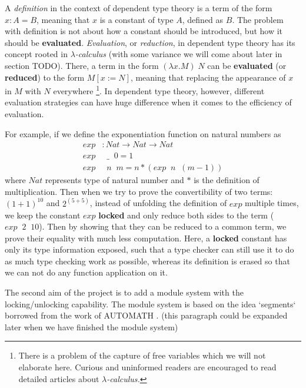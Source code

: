 \documentclass{article}
\theoremstyle{remark}
\begin{document}
A \emph{definition} in the context of dependent type theory is a term of the form $x : A = B$, meaning that $x$ is a constant of type $A$, defined as $B$. The problem with definition is not about how a constant should be introduced, but how it should be \textbf{evaluated}. \emph{Evaluation}, or \emph{reduction}, in dependent type theory has its concept rooted in \emph{$\lambda$-calculus} \cite{barendregt1984lambda} (with some variance we will come about later in section TODO). There, a term in the form $(\lambda x . M) \;N$ can be \textbf{evaluated} (or \textbf{reduced}) to the form $M[x := N]$, meaning that replacing the appearance of $x$ in $M$ with $N$ everywhere \footnote{There is a problem of the capture of free variables which we will not elaborate here. Curious and uninformed readers are encouraged to read detailed articles about \emph{$\lambda$-calculus.}}. In dependent type theory, however, different evaluation strategies can have huge difference when it comes to the efficiency of evaluation. 



For example, if we define the exponentiation function on natural numbers as
\begin{align*}
  exp &: Nat \to Nat \to Nat \\
  exp &\;\; \_\;\; 0 = 1 \\
  exp &\;\; n \;\; m = n * (exp \;\; n \;\; (m - 1))
\end{align*}
where $Nat$ represents type of natural number and $*$ is the definition of multiplication. Then when we try to prove the convertibility of two terms: $(1 + 1)^{10}$ and $2 ^ {(5+5)}$, instead of unfolding the definition of $exp$ multiple times, we keep the constant $exp$ \textbf{locked} and only reduce both sides to the term ($exp \;\; 2 \;\; 10$). Then by showing that they can be reduced to a common term, we prove their equality with much less computation. Here, a \textbf{locked} constant has only its type information exposed, such that a type checker can still use it to do as much type checking work as possible, whereas its definition is erased so that we can not do any function application on it.

The second aim of the project is to add a module system with the locking/unlocking capability. The module system is based on the idea `segments` borrowed from the work of AUTOMATH \cite{de1994survey}. (this paragraph could be expanded later when we have finished the module system)
\end{document}
